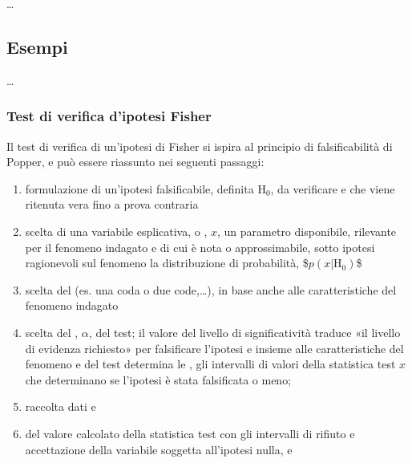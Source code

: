 \documentclass[letterpaper,10pt,italian]{jupyterBook}
\begin{document}
\sphinxAtStartPar
… 

\sphinxstepscope


\subsection{Esempi}
\label{\detokenize{ch/statistics/hp-test-examples:esempi}}\label{\detokenize{ch/statistics/hp-test-examples::doc}}
\sphinxAtStartPar
…

\sphinxstepscope


\subsubsection{Test di verifica d’ipotesi \sphinxhyphen{} Fisher}
\label{\detokenize{ch/statistics/test-fisher-coin-1:test-di-verifica-d-ipotesi-fisher}}\label{\detokenize{ch/statistics/test-fisher-coin-1::doc}}
\sphinxAtStartPar
Il test di verifica di un’ipotesi di Fisher si ispira al principio di falsificabilità di Popper, e può essere riassunto nei seguenti passaggi:
\begin{enumerate}
%
\item {} 
\sphinxAtStartPar
formulazione di un’ipotesi falsificabile, definita  \(\text{H}_0\), da verificare e che viene ritenuta vera fino a prova contraria

\item {} 
\sphinxAtStartPar
scelta di una variabile esplicativa, o , \(x\), un parametro disponibile, rilevante per il fenomeno indagato e di cui è nota \sphinxhyphen{} o approssimabile, sotto ipotesi ragionevoli sul fenomeno \sphinxhyphen{} la distribuzione di probabilità,
\$\(p(x|\text{H}_0)\)\$

\item {} 
\sphinxAtStartPar
scelta del  (es. una coda o due code,…), in base anche alle caratteristiche del fenomeno indagato

\item {} 
\sphinxAtStartPar
scelta del , \(\alpha\), del test; il valore del livello di significatività traduce «il livello di evidenza richiesto» per falsificare l’ipotesi e \sphinxhyphen{} insieme alle caratteristiche del fenomeno e del test \sphinxhyphen{} determina le , gli intervalli di valori della statistica test \(x\) che determinano se l’ipotesi è stata falsificata o meno;

\item {} 
\sphinxAtStartPar
raccolta dati e 

\item {} 
\sphinxAtStartPar
{} del valore calcolato della statistica test con gli intervalli di rifiuto e accettazione della variabile soggetta all’ipotesi nulla, e 

\end{enumerate}
\end{document}
